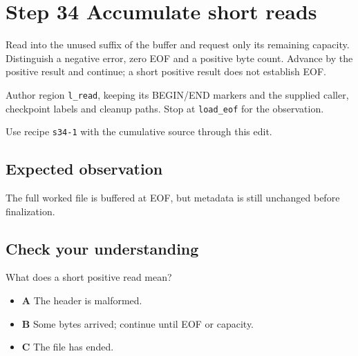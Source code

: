 \section{Step 34 Accumulate short reads}\label{ppm-s34}

Read into the unused suffix of the buffer and request only its remaining capacity. Distinguish a negative error, zero EOF and a positive byte count. Advance by the positive result and continue; a short positive result does not establish EOF.

Author region \texttt{l\_read}, keeping its BEGIN/END markers and the supplied caller, checkpoint labels and cleanup paths. Stop at \texttt{load\_eof} for the observation.

Use recipe \texttt{s34-1} with the cumulative source through this edit.

\subsection{Expected observation}
The full worked file is buffered at EOF, but metadata is still unchanged before finalization.

\subsection{Check your understanding}
What does a short positive read mean?

\begin{itemize}
\item \textbf{A} The header is malformed.
\item \textbf{B} Some bytes arrived; continue until EOF or capacity.
\item \textbf{C} The file has ended.
\end{itemize}
